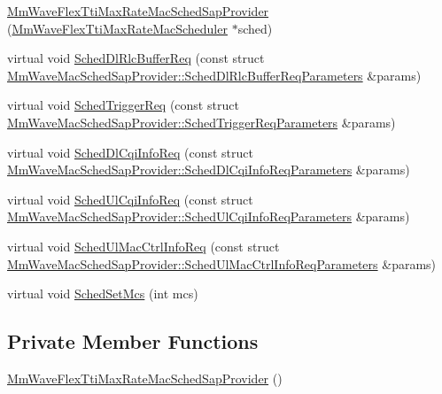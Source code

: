 \begin{DoxyCompactItemize}
\item 
\hyperlink{classns3_1_1MmWaveFlexTtiMaxRateMacSchedSapProvider_a4e8137d074292a1d850030d1902d1a19}{Mm\+Wave\+Flex\+Tti\+Max\+Rate\+Mac\+Sched\+Sap\+Provider} (\hyperlink{classns3_1_1MmWaveFlexTtiMaxRateMacScheduler}{Mm\+Wave\+Flex\+Tti\+Max\+Rate\+Mac\+Scheduler} $\ast$sched)
\item 
virtual void \hyperlink{classns3_1_1MmWaveFlexTtiMaxRateMacSchedSapProvider_ad093adfdf3ebf2a74214cf203c41e2cd}{Sched\+Dl\+Rlc\+Buffer\+Req} (const struct \hyperlink{structns3_1_1MmWaveMacSchedSapProvider_1_1SchedDlRlcBufferReqParameters}{Mm\+Wave\+Mac\+Sched\+Sap\+Provider\+::\+Sched\+Dl\+Rlc\+Buffer\+Req\+Parameters} \&params)
\item 
virtual void \hyperlink{classns3_1_1MmWaveFlexTtiMaxRateMacSchedSapProvider_aa853f2e2e2a2d44289bce20e9a4e8d0a}{Sched\+Trigger\+Req} (const struct \hyperlink{structns3_1_1MmWaveMacSchedSapProvider_1_1SchedTriggerReqParameters}{Mm\+Wave\+Mac\+Sched\+Sap\+Provider\+::\+Sched\+Trigger\+Req\+Parameters} \&params)
\item 
virtual void \hyperlink{classns3_1_1MmWaveFlexTtiMaxRateMacSchedSapProvider_aceaa6a9a9ea508236bcf8cfcc63ff4b6}{Sched\+Dl\+Cqi\+Info\+Req} (const struct \hyperlink{structns3_1_1MmWaveMacSchedSapProvider_1_1SchedDlCqiInfoReqParameters}{Mm\+Wave\+Mac\+Sched\+Sap\+Provider\+::\+Sched\+Dl\+Cqi\+Info\+Req\+Parameters} \&params)
\item 
virtual void \hyperlink{classns3_1_1MmWaveFlexTtiMaxRateMacSchedSapProvider_a726017c328e5d6884278c29e63784a66}{Sched\+Ul\+Cqi\+Info\+Req} (const struct \hyperlink{structns3_1_1MmWaveMacSchedSapProvider_1_1SchedUlCqiInfoReqParameters}{Mm\+Wave\+Mac\+Sched\+Sap\+Provider\+::\+Sched\+Ul\+Cqi\+Info\+Req\+Parameters} \&params)
\item 
virtual void \hyperlink{classns3_1_1MmWaveFlexTtiMaxRateMacSchedSapProvider_a51d11c6916c0de09b0e614a05d3ec652}{Sched\+Ul\+Mac\+Ctrl\+Info\+Req} (const struct \hyperlink{structns3_1_1MmWaveMacSchedSapProvider_1_1SchedUlMacCtrlInfoReqParameters}{Mm\+Wave\+Mac\+Sched\+Sap\+Provider\+::\+Sched\+Ul\+Mac\+Ctrl\+Info\+Req\+Parameters} \&params)
\item 
virtual void \hyperlink{classns3_1_1MmWaveFlexTtiMaxRateMacSchedSapProvider_a3741bedbc1ce1e39a789bef8419f413f}{Sched\+Set\+Mcs} (int mcs)
\end{DoxyCompactItemize}
\subsection*{Private Member Functions}
\begin{DoxyCompactItemize}
\item 
\hyperlink{classns3_1_1MmWaveFlexTtiMaxRateMacSchedSapProvider_a77f07836c70d1cdac86b555ed505d56d}{Mm\+Wave\+Flex\+Tti\+Max\+Rate\+Mac\+Sched\+Sap\+Provider} ()
\end{DoxyCompactItemize}
